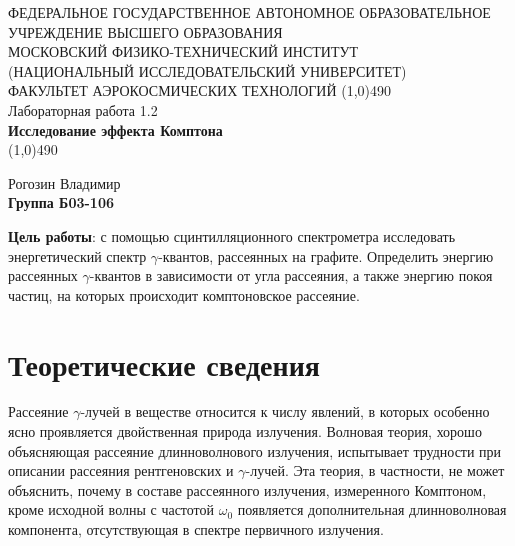 \documentclass[a4paper,12pt]{article}
\begin{document}
\begin{titlepage}
\begin{center}
\large{\small ФЕДЕРАЛЬНОЕ ГОСУДАРСТВЕННОЕ АВТОНОМНОЕ ОБРАЗОВАТЕЛЬНОЕ\\ УЧРЕЖДЕНИЕ ВЫСШЕГО ОБРАЗОВАНИЯ \\ МОСКОВСКИЙ ФИЗИКО-ТЕХНИЧЕСКИЙ ИНСТИТУТ\\ (НАЦИОНАЛЬНЫЙ ИССЛЕДОВАТЕЛЬСКИЙ УНИВЕРСИТЕТ)\\ ФАКУЛЬТЕТ АЭРОКОСМИЧЕСКИХ ТЕХНОЛОГИЙ}
\vfill
\line(1,0){490}\\[1mm]
\huge{Лабораторная работа 1.2}\\
\huge\textbf{Исследование эффекта Комптона}\\
\line(1,0){490}\\[1mm]
\vfill
\begin{flushright}
\normalsize{Рогозин Владимир}\\
\normalsize{\textbf{Группа Б03-106}}\\
\end{flushright}
\end{center}
\end{titlepage}

\textbf{Цель работы}:
с помощью сцинтилляционного спектрометра исследовать энергетический спектр $\gamma$-квантов, рассеянных на графите. Определить энергию рассеянных $\gamma$-квантов в зависимости от угла рассеяния, а также энергию покоя частиц, на которых происходит комптоновское рассеяние.




\section{Теоретические сведения}
Рассеяние $\gamma$-лучей в веществе относится к числу явлений, в которых особенно ясно проявляется двойственная природа излучения. Волновая теория, хорошо объясняющая рассеяние длинноволнового излучения, испытывает трудности при описании рассеяния рентгеновских и $\gamma$-лучей. Эта теория, в частности, не может объяснить, почему в составе рассеянного излучения, измеренного Комптоном, кроме исходной волны с частотой $\omega_0$ появляется дополнительная длинноволновая компонента, отсутствующая в спектре первичного излучения.
\end{document}
